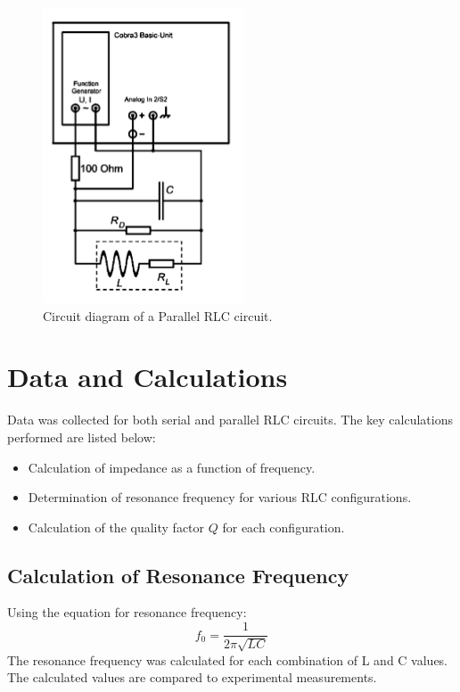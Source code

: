 \documentclass[journal]{IEEEtran}
\begin{document}
\begin{figure}[H]
    \centering
    \includegraphics[width=0.5\linewidth]{IMAGES/parallel_diagram.png}
    \caption{Circuit diagram of a Parallel RLC circuit.}
    \label{fig:parallel_circuit}
\end{figure}

\section{Data and Calculations}
Data was collected for both serial and parallel RLC circuits. The key calculations performed are listed below:
\begin{itemize}
    \item Calculation of impedance as a function of frequency.
    \item Determination of resonance frequency for various RLC configurations.
    \item Calculation of the quality factor $Q$ for each configuration.
\end{itemize}

\subsection{Calculation of Resonance Frequency}
Using the equation for resonance frequency:
\begin{equation}
    f_0 = \frac{1}{2\pi \sqrt{LC}}
\end{equation}
The resonance frequency was calculated for each combination of L and C values. The calculated values are compared to experimental measurements.
\end{document}
